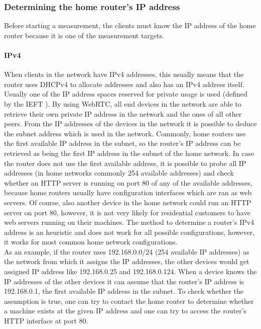 \documentclass{sig-alternate-10pt}
\begin{document}
\subsubsection{Determining the home router's IP address}

Before starting a measurement, the clients must know the IP address of the home router because it is one of the measurement targets. 

\paragraph{IPv4}When clients in the network have IPv4 addresses, this usually means that the router uses DHCPv4 to allocate addresses and also has an IPv4 address itself. Usually one of the IP address spaces reserved for private usage is used (defined by the IEFT \cite{groot_address_1996}). By using WebRTC, all end devices in the network are able to retrieve their own private IP address in the network and the ones of all other peers. From the IP addresses of the devices in the network it is possible to deduce the subnet address which is used in the network. Commonly, home routers use the first available IP address in the subnet, so the router's IP address can be retrieved as being the first IP address in the subnet of the home network. In case the router does not use the first available address, it is possible to probe all IP addresses (in home networks commonly 254 available addresses) and check whether an HTTP server is running on port 80 of any of the available addresses, because home routers usually have configuration interfaces which are ran as web servers. Of course, also another device in the home network could run an HTTP server on port 80, however, it is not very likely for residential customers to have web servers running on their machines. The method to determine a router's IPv4 address is an heuristic and does not work for all possible configurations, however, it works for most common home network configurations.\\
As an example, if the router uses 192.168.0.0/24 (254 available IP addresses) as the network from which it assigns the IP addresses, the other devices would get assigned IP address like 192.168.0.25 and 192.168.0.124. When a device knows the IP addresses of the other devices it can assume that the router's IP address is 192.168.0.1, the first available IP address in the subnet. To check whether the assumption is true, one can try to contact the home router to determine whether a machine exists at the given IP address and one can try to access the router's HTTP interface at port 80. 
\end{document}
